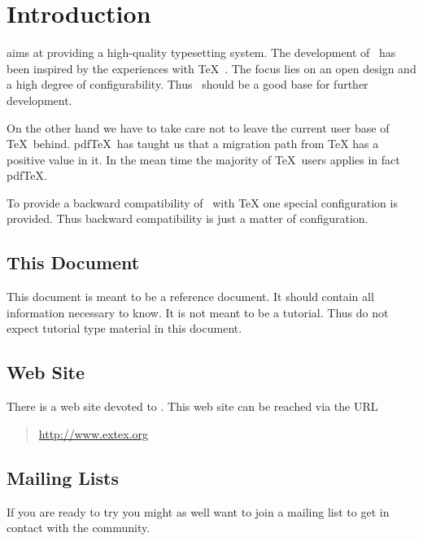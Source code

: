 \documentclass{extex-doc}
\begin{document}
\tableofcontents

\chapter{Introduction}

\ExTeX{} aims at providing a high-quality typesetting system. The
development of \ExTeX\ has been inspired by the experiences with \TeX\ \cite{knuth:texbook}.
The focus lies on an open design and a high degree of configurability.
Thus \ExTeX\ should be a good base for further development.

On the other hand we have to take care not to leave the current user
base of \TeX\ behind. pdf\TeX\ has taught us that a migration path
from \TeX{} has a positive value in it. In the mean time
the majority of \TeX\ users applies in fact
pdf\TeX{}.

To provide a backward compatibility of \ExTeX\ with
\TeX{} one special configuration is provided. Thus
backward compatibility is just a matter of configuration.


\section{This Document}

This document is meant to be a reference document. It should contain
all information necessary to know. It is not meant to be a tutorial.
Thus do not expect tutorial type material in this document.


\section{Web Site}

There is a web site devoted to \ExTeX. This
web site can be reached via the URL

\begin{quotation}
  \url{http://www.extex.org}
\end{quotation}


\section{Mailing Lists}

If you are ready to try \ExTeX{} you might as well want to join a
mailing list to get in contact with the community.
\end{document}
